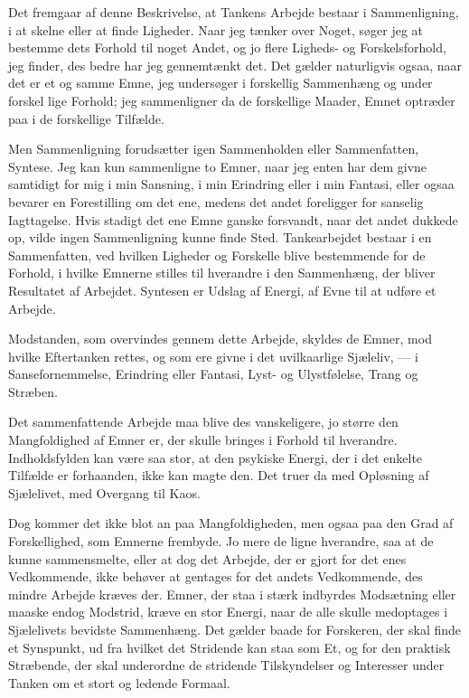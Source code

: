 \documentclass[12pt,a4paper]{book}
\newcommand{\opage}[1]{\marginnote{\footnotesize\textit{[#1]}}}
\newcommand{\apage}[1]{\marginnote{\footnotesize\textit{[#1]}}}
\begin{document}
Det fremgaar af denne Beskrivelse, at Tankens Arbejde bestaar i
Sammenligning, i at skelne eller at finde Ligheder. Naar jeg tænker
over Noget, søger jeg at bestemme dets Forhold til noget Andet, og jo
flere Ligheds- og Forskelsforhold, jeg finder, des bedre har jeg
gennemtænkt det. Det gælder naturligvis ogsaa, naar det er et og samme
Emne, jeg undersøger i forskellig Sammenhæng og under forskel%
\opage{4}lige
Forhold; jeg sammenligner da de forskellige Maader, Emnet optræder paa
i de forskellige Tilfælde.

Men Sammenligning forudsætter igen Sammenholden eller Sammenfatten,
Syntese. Jeg kan kun sammenligne to Emner, naar jeg enten har dem
givne samtidigt for mig i min Sansning, i min Erindring eller i min
Fantasi, eller ogsaa bevarer en Forestilling om det ene, medens det
andet foreligger for sanselig Iagttagelse. Hvis stadigt det ene Emne
ganske forsvandt, naar det andet dukkede op, vilde ingen Sammenligning
kunne finde Sted. Tankearbejdet bestaar i en Sammenfatten, ved hvilken
Ligheder og Forskelle blive bestemmende for de Forhold, i hvilke
Emnerne stilles til hverandre i den Sammenhæng, der bliver Resultatet
af Arbejdet. Syntesen er Udslag af Energi, af Evne til at udføre et
Arbejde.

Modstanden, som overvindes gennem dette Arbejde, skyldes de Emner, mod
hvilke Eftertanken rettes, og som ere givne i det uvilkaarlige
Sjæleliv, --- i Sansefornemmelse, Erindring eller Fantasi, Lyst- og
Ulystfølelse, Trang og Stræben.

Det sammenfattende Arbejde maa blive des vanskeligere, jo større den
Mangfoldighed af Emner er, der skulle bringes i Forhold til hverandre.
Indholdsfylden kan være saa stor, at den psykiske Energi, der i det
enkelte Tilfælde er forhaanden, ikke kan magte den. Det truer da med
Opløsning af Sjælelivet, med Overgang til Kaos.

Dog kommer det ikke blot an paa Mangfoldigheden, men ogsaa paa den
Grad af Forskellighed, som Emnerne frembyde. Jo mere de ligne
hverandre, saa at de kunne sammensmelte, eller at dog det Arbejde, der
er gjort for det enes Vedkommende, ikke behøver at gentages for det
andets Vedkommende, des mindre Arbejde kræves der. Emner, der staa i
stærk indbyrdes Modsætning eller maaske endog Modstrid, kræve en stor
Energi, naar de alle skulle medoptages i Sjælelivets bevidste
Sammenhæng. Det gælder baade for Forskeren, der skal finde et
Synspunkt, ud fra hvilket det Stridende kan staa som Et, og for den
praktisk Stræbende, \apage{5} der skal underordne de stridende Tilskyndelser og
Interesser under Tanken om et stort og ledende Formaal.
\end{document}
